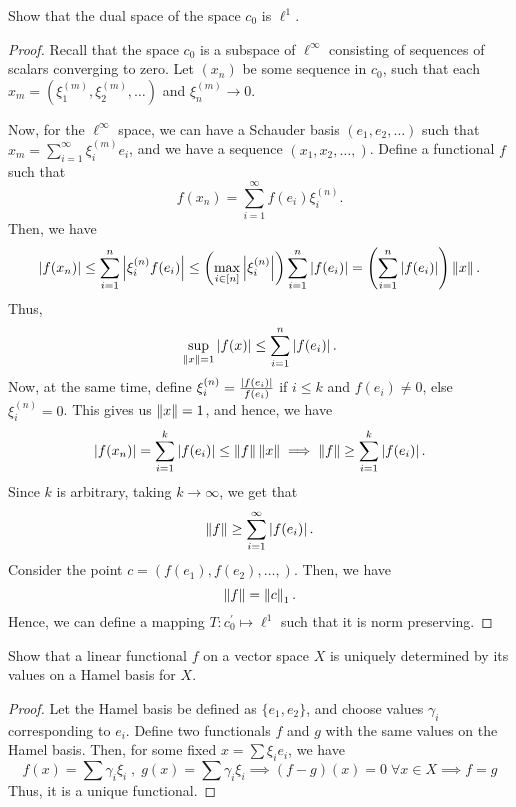 \begin{question}
    Show that the dual space of the space $c_0$ is $\ell^1$.
    \label{section2.10-8}
\end{question}
\begin{proof}
    Recall that the space $c_0$ is a subspace of $\ell^\infty$ consisting of sequences of scalars converging to zero. Let $(x_n)$ be some sequence in $c_0$, such that each $x_m = (\xi^{(m)}_1 , \xi^{(m)}_2 , \ldots )$ and $\xi^{(m)}_n \rightarrow 0$.

    Now, for the $\ell^\infty$ space, we can have a Schauder basis $(e_1 , e_2 , \ldots )$ such that $x_m = \sum_{i=1}^\infty \xi^{(m)}_i e_i$, and we have a sequence $(x_1 , x_2 , \ldots , )$. Define a functional $f$ such that
    \[f(x_n) = \sum_{i=1}^\infty f(e_i) \xi^{(n)}_i.\]
    Then, we have
    \[\left\lvert f(x_n) \right\rvert \leq \sum_{i=1}^n \left\lvert \xi^{(n)}_i f(e_i) \right\rvert \leq \left( \max_{i \in [n]} \left\lvert \xi^{(n)}_i \right\rvert\right) \sum_{i=1}^n \left\lvert f(e_i) \right\rvert  = \left( \sum_{i=1}^n \left\lvert f(e_i) \right\rvert \right) \left\lVert x \right\rVert.\]
    Thus, 
    \[\sup_{\left\lVert x \right\rVert = 1} \left\lvert f(x) \right\rvert \leq \sum_{i=1}^n \left\lvert f(e_i) \right\rvert.\]
    Now, at the same time, define $\xi^{(n)}_i = \frac{\left\lvert f(e_i) \right\rvert}{f(e_i)}$ if $i \leq k$ and $f(e_i) \neq 0$, else $\xi^{(n)}_i = 0$. This gives us $\left\lVert x \right\rVert = 1$, and hence,  we have
    \[\left\lvert f(x_n) \right\rvert = \sum_{i=1}^k \left\lvert f(e_i) \right\rvert \leq \left\lVert f \right\rVert \left\lVert x \right\rVert \implies \left\lVert f \right\rVert \geq  \sum_{i=1}^k \left\lvert f(e_i) \right\rvert.\]
    Since $k$ is arbitrary, taking $k \rightarrow \infty$, we get that
    \[\left\lVert f \right\rVert \geq \sum_{i=1}^\infty \left\lvert f(e_i) \right\rvert.\]
    Consider the point $c = (f(e_1) , f(e_2) , \ldots , )$. Then, we have
    \[\left\lVert f \right\rVert = \left\lVert c \right\rVert_1.\]
    Hence, we can define a mapping $T : c_0^\prime \mapsto \ell^1$ such that it is norm preserving.
\end{proof}

\begin{question}
    Show that a linear functional $f$ on a vector space $X$ is uniquely determined by its values on a Hamel basis for $X$.
    \label{section2.10-9}
\end{question}
\begin{proof}
    Let the Hamel basis be defined as $\{e_1 , e_2\}$, and choose values $\gamma_i$ corresponding to $e_i$. Define two functionals $f$ and $g$ with the same values on the Hamel basis. Then, for some fixed $x = \sum \xi_i e_i$, we have
    \[f(x) = \sum \gamma_i \xi_i \;,\; g(x) = \sum \gamma_i \xi_i \implies (f-g)(x) = 0 \;\forall x \in X \implies f = g\]
    Thus, it is a unique functional.
\end{proof}

